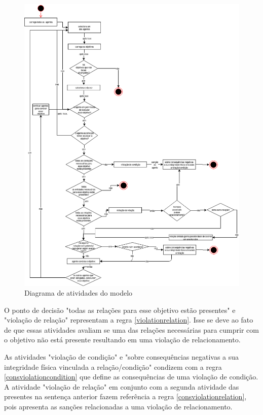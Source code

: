 \begin{figure}[H]
  \centering
  \includegraphics[width=1\linewidth]{figure/DiagramaDeAtividade.png} 
  \caption{Diagrama de atividades do modelo}
  \label{atividiagram}
\end{figure}

O ponto de decisão "todas as relações para esse objetivo estão presentes" e "violação de relação" representam a regra \ref{violationrelation}. Isse se deve ao fato de que essas atividades avaliam se uma das relações necessárias para cumprir 
com o objetivo não está presente resultando em uma violação de relacionamento. 

As atividades  "violação de condição" e "sobre consequências negativas a sua integridade física vinculada a relação/condição" condizem com a regra \ref{consviolationcondition} que define as consequências de uma violação de 
condição. A atividade "violação de relação" em conjunto com a segunda atividade das presentes na sentença anterior fazem referência a regra \ref{consviolationrelation}, pois apresenta as sanções relacionadas a uma violação de relacionamento. 

